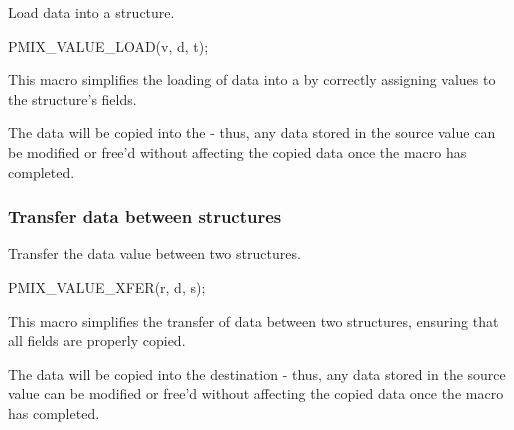 \summary

Load data into a  structure.

\cspecificstart
\begin{codepar}
PMIX_VALUE_LOAD(v, d, t);
\end{codepar}
\cspecificend

\begin{arglist}
\end{arglist}

\descr

This macro simplifies the loading of data into a  by correctly assigning values to the structure's fields.

\adviceuserstart
The data will be copied into the  - thus, any data stored in the source value can be modified or free'd without affecting the copied data once the macro has completed.
\adviceuserend


\subsubsection{Transfer data between  structures}

\summary

Transfer the data value between two  structures.

\cspecificstart
\begin{codepar}
PMIX_VALUE_XFER(r, d, s);
\end{codepar}
\cspecificend

\begin{arglist}
\end{arglist}

\descr

This macro simplifies the transfer of data between two  structures, ensuring that all fields are properly copied.

\adviceuserstart
The data will be copied into the destination  - thus, any data stored in the source value can be modified or free'd without affecting the copied data once the macro has completed.
\adviceuserend


